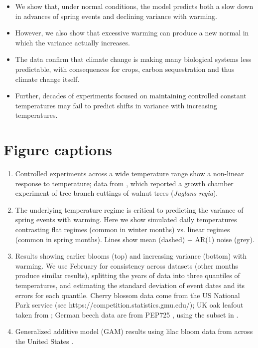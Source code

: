 \documentclass[11pt]{article}
\begin{document}
\begin{itemize}
\item We show that, under normal conditions, the model predicts both a slow down in advances of spring events  \citep[so-called `declining sensitivity',][]{wolkovich2021simple,walde2025rethinking} and declining variance with warming. 
\item However, we also show that excessive warming can produce a new normal in which the variance actually increases. 
\item The data confirm that climate change is making many biological systems less predictable, with consequences for crops, carbon sequestration and thus climate change itself. 
\item Further, decades of experiments focused on maintaining controlled constant temperatures may fail to predict shifts in variance with increasing temperatures. 
\end{itemize}

\section*{Figure captions}

\begin{enumerate}
\item Controlled experiments across a wide temperature range show a non-linear response to temperature; data from \citet{Charrier:2011aa}, which reported a growth chamber experiment of tree branch cuttings of walnut trees (\emph{Juglans regia}).
\item The underlying temperature regime is critical to predicting the variance of spring events with warming. Here we show simulated daily temperatures contrasting flat regimes (common in winter months) vs. linear regimes (common in spring months). Lines show mean (dashed) $+$ AR(1) noise (grey).
\item Results showing earlier blooms (top) and increasing variance (bottom) with warming. We use February for consistency across datasets (other months produce similar results), splitting the years of data into three quantiles of temperatures, and estimating the standard deviation of event dates and its errors for each quantile. Cherry blossom data come from the US National Park service (see https://competition.statistics.gmu.edu/); UK oak leafout taken from \citet{vitasse2022great}; German beech data are from PEP725 \citep{pep725}, using the subset in \citet{wolkovich2021simple}.
\item Generalized additive model (GAM) results using lilac bloom data from across the United States \citep{rosemartin2015lilac}.
\end{enumerate}



\end{document}
